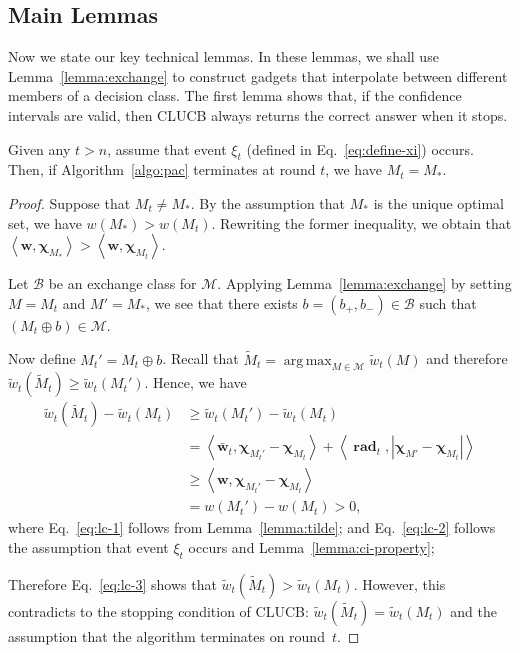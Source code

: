 \documentclass{article}
\newcommand{\Algorithm}{{\small \textsf{CLUCB}}\xspace}
\newcommand{\M}{\mathcal M}
\newcommand{\B}{\mathcal B}
\DeclareMathOperator{\rad}{rad}
\DeclareMathOperator*{\argmax}{arg\,max}
\newcommand{\inn}[1]{\left\langle #1 \right\rangle}
\renewcommand{\vec}[1]{\boldsymbol{#1}}
\begin{document}
\subsection{Main Lemmas}

Now we state our key technical lemmas.
In these lemmas, we shall use Lemma~\ref{lemma:exchange} to construct gadgets that interpolate between different members of a decision class.
The first lemma shows that, if the confidence intervals are valid, then \Algorithm always returns the correct answer when it stops.
\begin{lemma}
\label{lemma:correct}
Given any $t > n$, assume that event $\xi_t$ (defined in Eq.~\eqref{eq:define-xi}) occurs.
Then, if Algorithm~\ref{algo:pac} terminates at round $t$, we have $M_t=M_*$.
\end{lemma}

\begin{proof}
Suppose that $M_t \not= M_*$. 
By the assumption that $M_*$ is the unique optimal set, we have $w(M_*)>w(M_t)$. 
Rewriting the former inequality, we obtain that $\inn{\vec w, \vec\chi_{M_*}} > \inn{\vec w,\vec\chi_{M_t}}$.

Let $\B$ be an exchange class for $\M$.
Applying Lemma~\ref{lemma:exchange} by setting $M=M_t$ and $M'=M_*$, we see that 
there exists $b=(b_+,b_-)\in \B$ such that $(M_t \oplus b) \in \M$.


Now define $M_t' = M_t \oplus b$.
Recall that $\tilde M_t =\argmax_{M\in \M} \tilde w_t(M)$ and therefore $\tilde w_t(\tilde M_t) \ge \tilde w_t(M_t')$.
Hence, we have
\begin{align}
  \tilde w_t(\tilde M_t)-\tilde w_t(M_t) 
  &\ge \tilde w_t(M_t')-\tilde w_t(M_t) \nonumber \\
  &= \inn{\vec {\bar w}_t, \vec \chi_{M_t'}-\vec\chi_{M_t}}+\inn{\vec \rad_t, |\vec \chi_{M'}-\vec\chi_{M_t}|} \label{eq:lc-1}\\
  &\ge \inn{\vec w, \vec \chi_{M_t'}-\vec\chi_{M_t}} \label{eq:lc-2}\\
  &= w(M_t')-w(M_t) > 0 \label{eq:lc-3},
\end{align}
where Eq.~\eqref{eq:lc-1} follows from Lemma~\ref{lemma:tilde};
and Eq.~\eqref{eq:lc-2} follows the assumption that event $\xi_t$ occurs and Lemma~\ref{lemma:ci-property};

Therefore Eq.~\eqref{eq:lc-3} shows that $\tilde w_t(\tilde M_t) > \tilde w_t(M_t)$. 
However, this contradicts to the stopping condition of \Algorithm: $\tilde w_t(\tilde M_t) = \tilde w_t(M_t)$ and the assumption that the algorithm terminates on round~$t$.
\end{proof}
\end{document}
